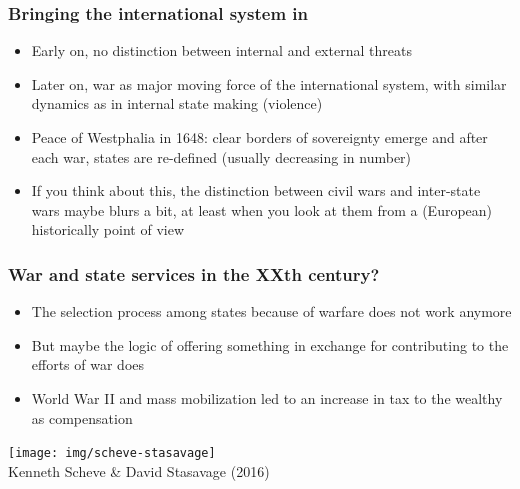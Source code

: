 \documentclass[utf8, xcolor=dvipsnames, handout]{beamer}
\begin{document}


\begin{frame}
\frametitle{Bringing the international system in}
\centering

\begin{itemize}[<+->]
  \item Early on, no distinction between internal and external threats
  \item Later on, war as major moving force of the international system, with similar dynamics as in internal state making (violence)
  \item Peace of Westphalia in 1648: clear borders of sovereignty emerge and after each war, states are re-defined (usually decreasing in number)
  \item If you think about this, the distinction between civil wars and inter-state wars maybe blurs a bit, at least when you look at them from a (European) historically point of view
\end{itemize}

\end{frame}

\begin{frame}
\frametitle{War and state services in the XXth century?}
\centering

\begin{minipage}{0.66\textwidth}\centering
\begin{itemize}
  \item The selection process among states because of warfare does not work anymore
  \item But maybe the logic of offering something in exchange for contributing to the efforts of war does
  \item World War II and mass mobilization led to an increase in tax to the wealthy as compensation
\end{itemize}
\end{minipage}\hfill
\begin{minipage}{0.33\textwidth}\centering
\texttt{[image: img/scheve-stasavage]}\\
{\small Kenneth Scheve \& David Stasavage (2016)}
\end{minipage}

\end{frame}
\end{document}
